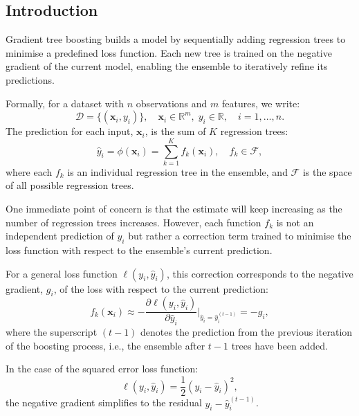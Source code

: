 \documentclass[11pt]{report} %
\begin{document}
\subsection{Introduction}
Gradient tree boosting builds a model by sequentially adding regression trees to minimise a predefined loss function. Each new tree is trained on the negative gradient of the current model, enabling the ensemble to iteratively refine its predictions.\cite{chen2016xgboost}

Formally, for a dataset with \( n \) observations and \( m \) features,
we write:
\[
\mathcal{D} = \{(\mathbf{x}_i, y_i)\}, \quad \mathbf{x}_i \in \mathbb{R}^m, \; y_i \in \mathbb{R}, \quad i = 1, \dots, n.
\]
The prediction for each input, \( \mathbf{x}_i \), is the sum of \( K \) regression trees:
\begin{equation}
\hat{y}_i = \phi(\mathbf{x}_i) = \sum_{k=1}^K f_k(\mathbf{x}_i), \quad f_k \in \mathcal{F},
\label{XGBoost Prediction}
\end{equation}
where each $f_k$ is an individual regression tree in the ensemble, and \( \mathcal{F} \) is the space of all possible regression trees.\cite{chen2016xgboost}

One immediate point of concern is that the estimate will keep increasing as the number of regression trees increases. However, each function \( f_k \) is not an independent prediction of \( y_i \) but rather a correction term trained to minimise the loss function with respect to the ensemble’s current prediction. 

For a general loss function \( \ell(y_i, \hat{y}_i) \), this correction corresponds to the negative gradient, $g_i$, of the loss with respect to the current prediction:
\[
f_k(\mathbf{x}_i) \approx -\frac{\partial \ell(y_i, \hat{y}_i)}{\partial \hat{y}_i}\Big|_{\hat{y}_i = \hat{y}_i^{(t-1)}}=-g_i,
\]
where the superscript \( (t - 1) \) denotes the prediction from the previous iteration of the boosting process, i.e., the ensemble after \( t - 1 \) trees have been added.

\noindent In the case of the squared error loss function:
\begin{equation}
\ell(y_i, \hat{y}_i) = \frac{1}{2}(y_i - \hat{y}_i)^2,
\label{residual}
\end{equation}
the negative gradient simplifies to the residual \( y_i - \hat{y}_i^{(t-1)} \).
\end{document}
